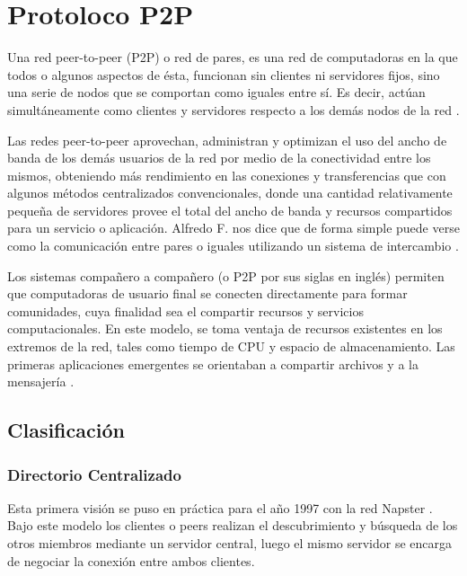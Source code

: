 
\chapter{Protoloco P2P} %

\label{ch:protocolo_p2p} %

Una red peer-to-peer (P2P) o red de pares, es una red de computadoras en la que todos o algunos aspectos de ésta, funcionan sin clientes ni servidores fijos, sino una serie de nodos que se comportan como iguales entre sí. Es decir, actúan simultáneamente como clientes y servidores respecto a los demás nodos de la red \cite{wiki_p2p}.

Las redes peer-to-peer aprovechan, administran y optimizan el uso del ancho de banda de los demás usuarios de la red por medio de la conectividad entre los mismos, obteniendo más rendimiento en las conexiones y transferencias que con algunos métodos centralizados convencionales, donde una cantidad relativamente pequeña de servidores provee el total del ancho de banda y recursos compartidos para un servicio o aplicación.
Alfredo F. nos dice que de forma simple puede verse como la comunicación entre pares o iguales utilizando un sistema de intercambio \cite{bordignon:2005}.

Los sistemas compañero a compañero (o P2P por sus siglas en inglés) permiten que computadoras de usuario final se conecten directamente para formar comunidades, cuya finalidad sea el compartir recursos y servicios computacionales. En este modelo, se toma ventaja de recursos existentes en los extremos de la red, tales como tiempo de CPU y espacio de almacenamiento. Las primeras aplicaciones  emergentes se orientaban a compartir archivos y a la mensajería \cite{bordignon:2005}.



\section{Clasificación}

\subsection{Directorio Centralizado}

Esta primera visión se puso en práctica para el año 1997 con la red Napster \cite{rfc4981}. Bajo este modelo los clientes o peers realizan el descubrimiento y búsqueda de los otros miembros mediante un servidor central, luego el mismo servidor se encarga de negociar la conexión entre ambos clientes.

